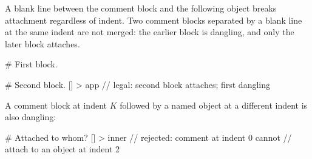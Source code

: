 A blank line between the comment block and the following object breaks
  attachment regardless of indent.
Two comment blocks separated by a blank line at the same indent are
  not merged: the earlier block is dangling, and only the later block
  attaches.

\begin{ffcode}
# First block.

# Second block.
[] > app                     // legal: second block attaches; first dangling
\end{ffcode}

A comment block at indent \(K\) followed by a named object at a
  different indent is also dangling:

\begin{ffcode}
# Attached to whom?
  [] > inner                 // rejected: comment at indent 0 cannot
                             //   attach to an object at indent 2
\end{ffcode}
